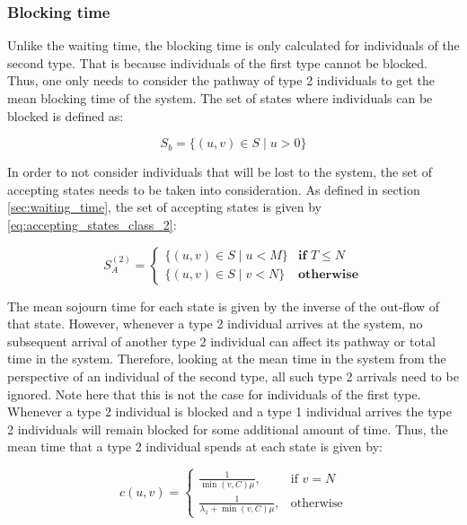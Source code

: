 \subsubsection{Blocking time}


Unlike the waiting time, the blocking time is only calculated for individuals of
the second type.  
That is because individuals of the first type cannot be blocked. 
Thus, one only needs to consider the pathway of type 2 individuals to get the 
mean blocking time of the system. 
The set of states where individuals can be blocked is defined as:

\begin{equation} \label{eq:set_of_blocking_states}
    S_b = \{(u,v) \in S \; | \; u > 0\}
\end{equation}
 
In order to not consider individuals that will be lost to the system, the set of 
accepting states needs to be taken into consideration. 
As defined in section \ref{sec:waiting_time}, the set of accepting states is 
given by \ref{eq:accepting_states_class_2}:

\begin{equation*}
    S_A^{(2)}=
    \begin{cases}
        \{(u, v) \in S \; | \; u < M \} & \textbf{if } T \leq N\\
        \{(u, v) \in S \; | \; v < N \} & \textbf{otherwise}
    \end{cases}
\end{equation*}

The mean sojourn time for each state is given by the inverse of the out-flow of
that state.
However, whenever a type 2 individual arrives at the system, no subsequent 
arrival of another type 2 individual can affect its pathway or total time in 
the system.
Therefore, looking at the mean time in the system from the perspective of an 
individual of the second type, all such type 2 arrivals need to be ignored.
Note here that this is not the case for individuals of the first type.
Whenever a type 2 individual is blocked and a type 1 individual arrives the type
2 individuals will remain blocked for some additional amount of time.
Thus, the mean time that a type 2 individual spends at each state is given by:

\begin{equation}\label{eq:time_in_state_blocking_time}
    c(u,v) = 
    \begin{cases}
        \frac{1}{\min(v,C) \mu}, & \text{if } v = N\\
        \frac{1}{\lambda_1 + \min(v,C) \mu}, & \text{otherwise}
    \end{cases}
\end{equation}
 
